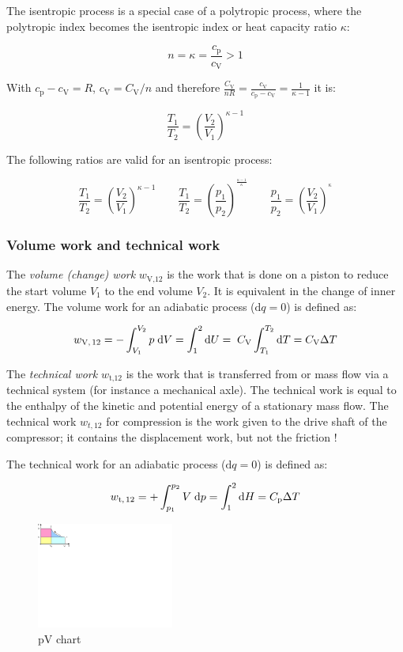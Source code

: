 \documentclass[11pt,a4paper,english,twoside]{scrreprt}
\begin{document}
The isentropic process is a special case of a polytropic process, where the polytropic index becomes the isentropic index or heat capacity ratio $\kappa$:

\[n=\kappa =\frac{c_\text{p}}{c_\text{V}} >1\]


With $c_\text{p} -c_\text{V} =R$, $c_\text{V} = C_\text{V} / n$ and therefore $\frac{C_\text{V}}{nR} =\frac{c_\text{V}}{c_\text{p} -c_\text{V}} =\frac{1}{\kappa -1}$ it is:

\[\frac{T_1}{T_2 } =\left(\frac{V_2}{V_1} \right)^{\kappa -1} \]


The following ratios are valid for an isentropic process:

\[\frac{T_1}{T_2} =\left(\frac{V_2}{V_1} \right)^{\kappa -1}   \qquad
\frac{T_1}{T_2} =\left(\frac{p_1}{p_2} \right)^{^{\frac{\kappa -1}{\kappa } } }   \qquad
\frac{p_1}{p_2} =\left(\frac{V_2}{V_1} \right)^{^{\kappa } } \]




\subsubsection{Volume work and technical work}

The \textit{volume (change) work} $w_\text{V,12}$ is the work that is done on a piston to reduce the start volume $V_1$ to the end volume $V_2$. It is equivalent in the change of inner energy. The volume work for an adiabatic process ($\mathrm{d}q=0$) is defined as:

\[
w_\text{V,\,12}  = -\int_{V_1}^{V_2}p\;\mathrm{d}V = \int_{1}^{2}\mathrm{d}U = \; C_\text{V} \int_{T_1 }^{T_2 }\mathrm{d}T=C_\text{V} \Delta T
\]

The \textit{technical work} $w_\text{t,12} $ is the work that is transferred from or mass flow via a technical system (for instance a mechanical axle). The technical work is equal to the enthalpy of the kinetic and potential energy of a stationary mass flow. The technical work $w_{t,12} $ for compression is the work given to the drive shaft of the compressor; it contains the displacement work, but not the friction \cite{Winklmair}!

The technical work for an adiabatic process ($\mathrm{d}q=0$) is defined as:

\[
w_\text{t,\,12}  = + \int_{p_1}^{p_2}V\; \mathrm{d}p = \int_{1}^{2}\mathrm{d}H = C_\text{p}\Delta T
\]


\begin{figure}
  \centering
  \includegraphics*[width=0.4\textwidth,angle=0]{FCF_Figure_comp_pV.pdf}
  \caption[pV chart]{pV chart}
  \label{fig:pV_chart}
\end{figure}
\end{document}
